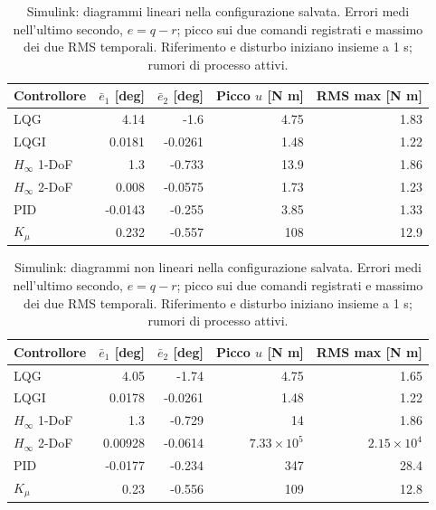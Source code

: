 \begin{table}[htbp]\centering\small
\begin{tabular}{lrrrr}\toprule
Controllore & $\bar e_1$ [deg] & $\bar e_2$ [deg] & Picco $u$ [N m] & RMS max [N m]\\\midrule
LQG & 4.14 & -1.6 & 4.75 & 1.83\\
LQGI & 0.0181 & -0.0261 & 1.48 & 1.22\\
$H_\infty$ 1-DoF & 1.3 & -0.733 & 13.9 & 1.86\\
$H_\infty$ 2-DoF & 0.008 & -0.0575 & 1.73 & 1.23\\
PID & -0.0143 & -0.255 & 3.85 & 1.33\\
$K_\mu$ & 0.232 & -0.557 & 108 & 12.9\\
\bottomrule\end{tabular}
\caption{Simulink: diagrammi lineari nella configurazione salvata. Errori medi nell’ultimo secondo, $e=q-r$; picco sui due comandi registrati e massimo dei due RMS temporali. Riferimento e disturbo iniziano insieme a 1 s; rumori di processo attivi.}
\label{tab:simulink-linear}\end{table}
\begin{table}[htbp]\centering\small
\begin{tabular}{lrrrr}\toprule
Controllore & $\bar e_1$ [deg] & $\bar e_2$ [deg] & Picco $u$ [N m] & RMS max [N m]\\\midrule
LQG & 4.05 & -1.74 & 4.75 & 1.65\\
LQGI & 0.0178 & -0.0261 & 1.48 & 1.22\\
$H_\infty$ 1-DoF & 1.3 & -0.729 & 14 & 1.86\\
$H_\infty$ 2-DoF & 0.00928 & -0.0614 & $7.33\times10^{5}$ & $2.15\times10^{4}$\\
PID & -0.0177 & -0.234 & 347 & 28.4\\
$K_\mu$ & 0.23 & -0.556 & 109 & 12.8\\
\bottomrule\end{tabular}
\caption{Simulink: diagrammi non lineari nella configurazione salvata. Errori medi nell’ultimo secondo, $e=q-r$; picco sui due comandi registrati e massimo dei due RMS temporali. Riferimento e disturbo iniziano insieme a 1 s; rumori di processo attivi.}
\label{tab:simulink-nonlinear}\end{table}
